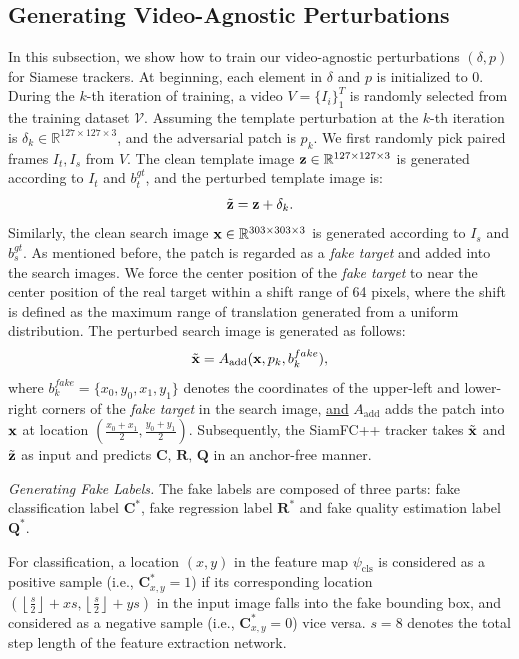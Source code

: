 \documentclass[journal]{IEEEtran}
\newcommand{\ie}{i.e.}
\begin{document}
\subsection{Generating Video-Agnostic Perturbations}\label{generate}

In this subsection, we show how to train our video-agnostic perturbations $(\delta, p)$ for Siamese trackers. At beginning, each element in $\delta$ and $p$ is initialized to 0. During the $k$-th iteration of training, a video $V=\{I_i\}_1^T$ is randomly selected from the training dataset $\mathcal V$. Assuming the template perturbation at the $k$-th iteration is $\delta_k \in \mathbb{R}^{127\times 127 \times 3}$, and the adversarial patch is $p_k$. We first randomly pick paired frames $I_t, I_s$ from $V$. The clean template image $\textbf z\in \mathbb{R}^{127\times 127 \times 3}$ is generated according to $I_t$ and $b^{gt}_t$, and the perturbed template image is:
\begin{equation}
\tilde {\textbf z} = \textbf z + \delta_k.
\end{equation}
Similarly, the clean search image $\textbf x \in \mathbb{R}^{303\times 303 \times 3}$ is generated according to $I_s$ and $b^{gt}_s$. As mentioned before, the patch is regarded as a \textit{fake target} and added into the search images. We force the center position of the \textit{fake target} to near the center position of the real target within a shift range of 64 pixels, where the shift is defined as the maximum range of translation generated from a uniform distribution. The perturbed search image is generated as follows:
\begin{equation}
\tilde{\textbf x} = A_{\text{add}}(\textbf x, p_k, b^{fake}_k),
\end{equation}
where $ b^{fake}_k = \{x_0, y_0, x_1, y_1\}$ denotes the coordinates of the upper-left and lower-right corners of the \textit{fake target} in the search image, \uline{and} $A_\text{add}$ adds the patch into $\textbf x$ at location $(\frac{x_0+x_1}{2},\frac{y_0+y_1}{2})$. Subsequently, the SiamFC++ tracker takes $\tilde {\textbf x}$ and $\tilde{\textbf z}$ as input and predicts $\textbf{C, R, Q}$ in an anchor-free manner.

\textit{Generating Fake Labels.} The fake labels are composed of three parts: fake classification label $\textbf{C}^*$, fake regression label $\textbf{R}^*$ and fake quality estimation label $\textbf{Q}^*$.

For classification, a location $(x,y)$ in the feature map $\psi_{\mathrm{cls}}$ is considered as a positive sample (\ie, $\textbf{C}^*_{x,y} = 1$) if its corresponding location $\left(\left\lfloor\frac{s}{2}\right\rfloor+x s,\left\lfloor\frac{s}{2}\right\rfloor+y s\right)$ in the input image falls into the fake bounding box, and considered as a negative sample (\ie, $\textbf{C}^*_{x,y} = 0$) vice versa. $s=8$ denotes the total step length of the feature extraction network.
\end{document}
